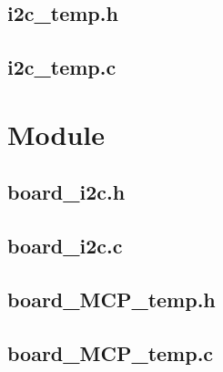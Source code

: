 \documentclass[a4paper,12pt]{article}
\begin{document}
\subsection{i2c\_temp.h}

\newpage
\subsection{i2c\_temp.c}

\newpage
\section{Module}
\subsection{board\_i2c.h}

\newpage
\subsection{board\_i2c.c}

\newpage
\subsection{board\_MCP\_temp.h}

\newpage
\subsection{board\_MCP\_temp.c}

\end{document}

